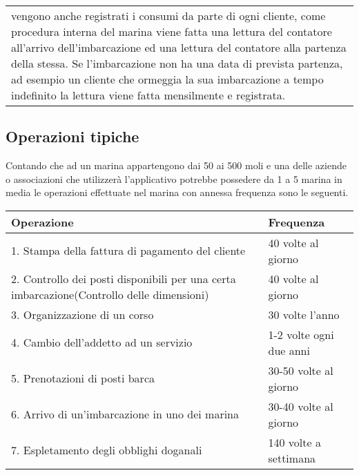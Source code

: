 \begin{center}
    \begin{tabularx}{\textwidth}{|X|}
        \hline
        \rowcolor{gray!30}
        \multicolumn{1}{|c|}{\textbf{Frasi relative a Consumo}}\\
        \hline
        vengono anche registrati i consumi da parte di ogni cliente, come procedura interna del marina viene fatta una lettura del contatore all'arrivo dell'imbarcazione ed una lettura del contatore alla partenza della stessa. Se l'imbarcazione non ha una data di prevista partenza, ad esempio un cliente che ormeggia la sua imbarcazione a tempo indefinito la lettura viene fatta mensilmente e registrata.\\
        \hline
    \end{tabularx}
\end{center}

\subsection{Operazioni tipiche}
Contando che ad un marina appartengono dai 50 ai 500 moli e una delle aziende o associazioni che utilizzerà l'applicativo potrebbe possedere da 1 a 5 marina in media le operazioni effettuate nel marina con annessa frequenza sono le seguenti.
\begin{center}
    \begin{tabularx}{\textwidth}{|p{90mm}|X|}
        \hline
        \rowcolor{gray!30}
        \textbf{Operazione} & \textbf{Frequenza}\\
        \hline
        1. Stampa della fattura di pagamento del cliente & 40 volte al giorno\\
        \hline
        2. Controllo dei posti disponibili per una certa imbarcazione(Controllo delle dimensioni)& 40 volte al giorno\\
        \hline
        3. Organizzazione di un corso & 30 volte l'anno\\
        \hline
        4. Cambio dell'addetto ad un servizio & 1-2 volte ogni due anni\\
        \hline
        5. Prenotazioni di posti barca & 30-50 volte al giorno\\
        \hline
        6. Arrivo di un'imbarcazione in uno dei marina & 30-40 volte al giorno\\
        \hline
        7. Espletamento degli obblighi doganali & 140 volte a settimana\\
        \hline
    \end{tabularx}
\end{center}
